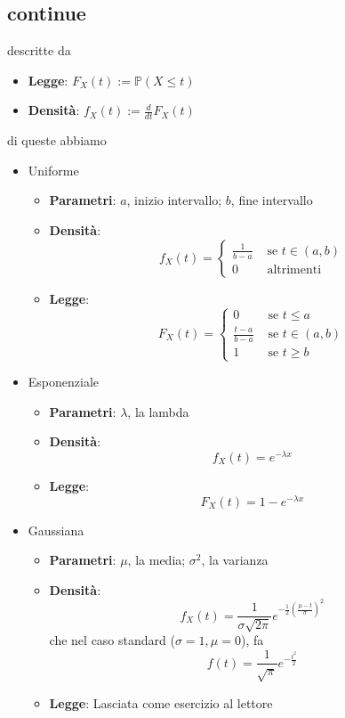 \documentclass{article}
\begin{document}
\subsection{continue}
descritte da
\begin{itemize}
\item \textbf{Legge}: $F_X (t) := \mathbb{P}(X \leq t)$
\item \textbf{Densità}: $f_X (t) := \frac{d}{dt}F_X(t)$
\end{itemize}

di queste abbiamo
\begin{itemize}
\item Uniforme
  \begin{itemize}
  \item \textbf{Parametri}: $a$, inizio intervallo; $b$, fine intervallo
  \item \textbf{Densità}:
    \[ f_X(t) = \begin{cases}
      \frac{1}{b-a} &\text{ se } t \in (a,b) \\
      0 &\text{ altrimenti }
    \end{cases}
    \]
  \item \textbf{Legge}:
    \[ F_X(t) = \begin{cases}
      0 & \text{ se } t \leq a \\
      \frac{t-a}{b-a} & \text{ se } t \in (a, b) \\
      1 & \text{ se } t \geq b
    \end{cases}
    \]
  \end{itemize}

\item Esponenziale
  \begin{itemize}
  \item \textbf{Parametri}: $\lambda$, la lambda
  \item \textbf{Densità}:
    \[ f_X(t) = e^{-\lambda x} \]
  \item \textbf{Legge}:
    \[ F_X(t) = 1 - e^{-\lambda x}\]
  \end{itemize}

\item Gaussiana
  \begin{itemize}
  \item \textbf{Parametri}: $\mu$, la media; $\sigma^2$, la varianza
  \item \textbf{Densità}: \\
    \[
    f_X(t) = \frac{1}{\sigma \sqrt{2 \pi}} e^{-\frac{1}{2} {(\frac{\mu - t}{\sigma})}^2}
    \]
    che nel caso standard ($\sigma = 1, \mu = 0$), fa
    \[
    f(t) = \frac{1}{\sqrt{\pi}} e^{-\frac{t^2}{2}}
    \]
  \item \textbf{Legge}: Lasciata come esercizio al lettore
  \end{itemize}


\end{itemize}
\end{document}
